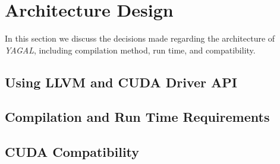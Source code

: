 \section{Architecture Design}
In this section we discuss the decisions made regarding the architecture of \textit{YAGAL}, including compilation method, run time, and compatibility.

\subsection{Using LLVM and CUDA Driver API}

\subsection{Compilation and Run Time Requirements}

\subsection{CUDA Compatibility}
